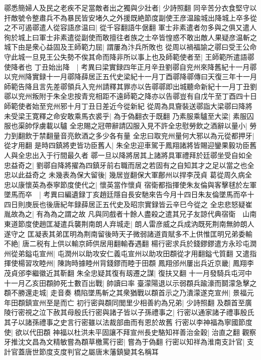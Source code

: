 鄩悉簡婦人及民之老疾不足當敵者出之獨與少壯者|{
	少詩照翻}
同辛苦分衣食堅守以扞敵號令整肅兵不為暴民皆安堵久之外援既絶節度副使王彦温踰城出降城上卒多從之不可遏鄩遣人從容語彦温曰|{
	從千容翻語牛倨翻}
軍士非素遣者勿多與之俱又遣人徇於城上曰軍士非素遣從副使而敢擅往者族之士卒皆惶惑不敢出敵人果疑彦温斬之城下由是衆心益固及王師範力屈|{
	謂屢為汴兵所敗也}
從周以禍福諭之鄩曰受王公命守此城一旦見王公失勢不俟其命而降非所以事上也及師範使者至|{
	王師範所遣語鄩使降者也}
丁丑始出降　|{
	考異曰梁實録四年正月辛丑劉鄩自兖州來降舊紀十一月鄩以兖州降實録十一月鄩降薛居正五代史梁紀十一月丁酉鄩降鄩傳曰天復三年十一月師範告降且言先差鄩領兵入兖州請釋其罪亦以告鄩鄩即出城聽命新紀十一月丁丑劉鄩以兖州叛附于朱全忠按青兖相距不遠師範之降亦以告鄩豈有自戊午至丁酉四十日師範使者始至兖州邪十月丁丑日差近今從新紀}
從周為具齎裝送鄩詣大梁鄩曰降將未受梁王寛釋之命安敢乘馬衣裘乎|{
	為于偽翻衣于既翻}
乃素服乘驢至大梁|{
	素服囚服也渠帥俘虜載以驢}
全忠賜之冠帶辭請囚服入見不許全忠慰勞飲之酒辭以量小|{
	勞力到翻飲于禁翻量音亮飲酒之多少各有量}
全忠曰取兖州量何大邪以為元從都押牙|{
	從才用翻}
是時四鎮將吏皆功臣舊人|{
	朱全忠迎車駕于鳳翔諸將皆賜迎鑾果毅功臣舊人與全忠出入于行間最久者}
鄩一旦以降將居其上諸將具軍禮拜於廷鄩坐受自如全忠益奇之|{
	劉鄩自降將擢為四鎮牙前右職而居之若固有之自知其才之足以當之也全忠以此益奇之}
未幾表為保大留後|{
	幾居豈翻保大軍鄜州以捍李茂貞}
葛從周久病全忠以康懷英為泰寧節度使代之|{
	懷英當作懷貞}
宿衛都指揮使朱友倫與客擊毬於左軍墜馬而卒　|{
	考異曰編遺録丁亥趙廷隱自長安馳來告今月十四日朱友倫墜馬而卒十四日則庚辰也後唐紀年録薛居正五代史及昭宗實録皆云辛巳今從之}
全忠悲怒疑崔胤故為之|{
	有為為之謂之故}
凡與同戲者十餘人盡殺之遣其兄子友諒代典宿衛　山南東道節度使趙匡凝遣兵襲荆南朗人弃城走|{
	朗人雷彦威之兵成汭既死荆南無帥朗人遂守之}
匡凝表其弟匡明為荆南留後時天子微弱諸道貢賦多不上供惟匡明兄弟委輸不絶|{
	唐二税有上供以輸京師供居用翻輸舂遇翻}
楊行密求兵於錢鏐鏐遣方永珍屯潤州從弟鎰屯宣州|{
	屯潤州以助攻安仁義屯宣州以助攻田頵從才用翻鎰弋質翻}
又遣指揮使楊習攻睦州|{
	陳詢時據睦州背錢鏐而睦于田頵}
鳳翔邠州屢出兵近京畿|{
	鳳翔李茂貞邠李繼徽近其靳翻}
朱全忠疑其復有刼遷之謀|{
	復扶又翻}
十一月發騎兵屯河中　十一月乙亥田頵帥死士數百出戰|{
	帥讀曰率}
臺濛陽退以示弱頵兵踰濠而鬬濛急擊之頵不勝還走城|{
	走音奏}
橋陷墜馬斬之其衆猶戰以頵首示之乃潰濛遂克宣州|{
	景福元年田頵鎮宣州至是而亡}
初行密與頵同閭里少相善約為兄弟|{
	少詩照翻}
及頵首至廣陵行密視之泣下赦其母殷氏行密與諸子皆以子孫禮事之|{
	行密以通家諸子禮事殷氏其子以諸孫禮事之史言行密雖以法裁部曲而有恩於故舊}
行密以李神福為寧國節度使|{
	欲以代田頵}
神福以杜洪未平固讓不拜宣州長史駱知祥善治金穀|{
	治直之翻}
觀察牙推沈文昌為文精敏嘗為頵草檄罵行密|{
	嘗為于偽翻}
行密以知祥為淮南支計官|{
	支計官蓋唐世節度支度判官之屬唐末藩鎮變其名稱耳}
